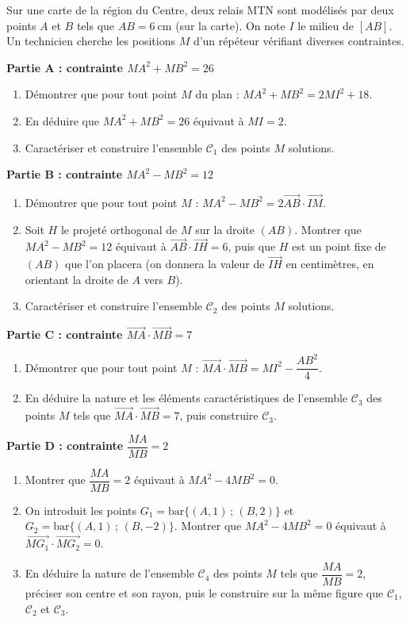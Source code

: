 \documentclass[11pt]{article}
\begin{document}
\begin{exercice}
Sur une carte de la région du Centre, deux relais MTN sont modélisés par deux points $A$ et $B$ tels que $AB = 6\ \mathrm{cm}$ (sur la carte). On note $I$ le milieu de $[AB]$. Un technicien cherche les positions $M$ d'un répéteur vérifiant diverses contraintes.

\textbf{Partie A : contrainte $MA^2 + MB^2 = 26$}
\begin{enumerate}
\item Démontrer que pour tout point $M$ du plan : $MA^2 + MB^2 = 2MI^2 + 18$.
\item En déduire que $MA^2 + MB^2 = 26$ équivaut à $MI = 2$.
\item Caractériser et construire l'ensemble $\mathcal{C}_1$ des points $M$ solutions.
\end{enumerate}

\textbf{Partie B : contrainte $MA^2 - MB^2 = 12$}
\begin{enumerate}
\item Démontrer que pour tout point $M$ : $MA^2 - MB^2 = 2\overrightarrow{AB} \cdot \overrightarrow{IM}$.
\item Soit $H$ le projeté orthogonal de $M$ sur la droite $(AB)$. Montrer que $MA^2 - MB^2 = 12$ équivaut à $\overrightarrow{AB} \cdot \overrightarrow{IH} = 6$, puis que $H$ est un point fixe de $(AB)$ que l'on placera (on donnera la valeur de $\overrightarrow{IH}$ en centimètres, en orientant la droite de $A$ vers $B$).
\item Caractériser et construire l'ensemble $\mathcal{C}_2$ des points $M$ solutions.
\end{enumerate}

\textbf{Partie C : contrainte $\overrightarrow{MA} \cdot \overrightarrow{MB} = 7$}
\begin{enumerate}
\item Démontrer que pour tout point $M$ : $\overrightarrow{MA} \cdot \overrightarrow{MB} = MI^2 - \dfrac{AB^2}{4}$.
\item En déduire la nature et les éléments caractéristiques de l'ensemble $\mathcal{C}_3$ des points $M$ tels que $\overrightarrow{MA} \cdot \overrightarrow{MB} = 7$, puis construire $\mathcal{C}_3$.
\end{enumerate}

\textbf{Partie D : contrainte $\dfrac{MA}{MB} = 2$}
\begin{enumerate}
\item Montrer que $\dfrac{MA}{MB} = 2$ équivaut à $MA^2 - 4MB^2 = 0$.
\item On introduit les points $G_1 = \mathrm{bar}\{(A,1)\,;\,(B,2)\}$ et $G_2 = \mathrm{bar}\{(A,1)\,;\,(B,-2)\}$. Montrer que $MA^2 - 4MB^2 = 0$ équivaut à $\overrightarrow{MG_1} \cdot \overrightarrow{MG_2} = 0$.
\item En déduire la nature de l'ensemble $\mathcal{C}_4$ des points $M$ tels que $\dfrac{MA}{MB} = 2$, préciser son centre et son rayon, puis le construire sur la même figure que $\mathcal{C}_1$, $\mathcal{C}_2$ et $\mathcal{C}_3$.
\end{enumerate}
\end{exercice}
\end{document}
